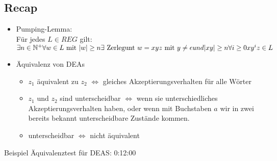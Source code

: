\documentclass{article}
\begin{document}
\subsection*{Recap}
\begin{itemize}
    \item Pumping-Lemma: \\
    Für jedes $L \in REG$ gilt: \\
    $
        \exists n \in \mathbb{N}^+ \\
        \forall w \in L \text{ mit } |w| \geq n \\
        \exists \text{ Zerlegunt } w = xyz \text{ mit } y \neq \epsilon
        und |xy| \geq n \\
        \forall i \geq 0 \\
        xy^iz \in L
    $
    \item Äquivalenz von DEAs
    \begin{itemize}
        \item $z_1$ äquivalent zu $z_2$ $\Leftrightarrow$ gleiches 
        Akzeptierungsverhalten für alle Wörter
        \item $z_1$ und $z_2$ sind unterscheidbar $\Leftrightarrow$ wenn
        sie unterschiedliches Akzeptierungsverhalten haben, oder wenn mit 
        Buchstaben $a$ wir in zwei bereits bekannt unterscheidbare 
        Zustände kommen.
        \item unterscheidbar $\Leftrightarrow$ nicht äquivalent
    \end{itemize}
\end{itemize}
Beispiel Äquivalenztest für DEAS: 0:12:00
\end{document}
